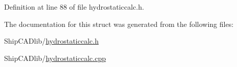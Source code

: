 Definition at line 88 of file hydrostaticcalc.\-h.



The documentation for this struct was generated from the following files\-:\begin{DoxyCompactItemize}
\item 
Ship\-C\-A\-Dlib/\hyperlink{hydrostaticcalc_8h}{hydrostaticcalc.\-h}\item 
Ship\-C\-A\-Dlib/\hyperlink{hydrostaticcalc_8cpp}{hydrostaticcalc.\-cpp}\end{DoxyCompactItemize}
